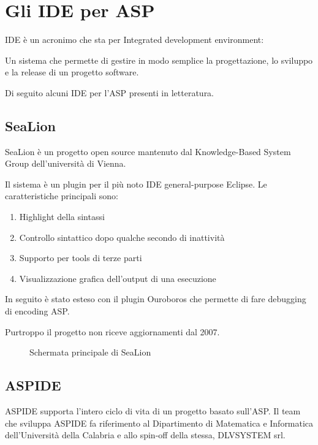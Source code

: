 \chapter[Gli IDE per ASP]{Gli IDE per ASP}

IDE è un acronimo che sta per Integrated development environment: 

Un sistema che permette di gestire in modo semplice la progettazione, lo sviluppo e la release di un progetto software.

Di seguito alcuni IDE per l'ASP presenti in letteratura.

\section{SeaLion}
SeaLion\cite{SEALION} è un progetto open source mantenuto dal Knowledge-Based System Group dell'università di Vienna.

Il sistema è un plugin per il più noto IDE general-purpose Eclipse.
Le caratteristiche principali sono:
\begin{enumerate}
	\item Highlight della sintassi
	\item Controllo sintattico dopo qualche secondo di inattività
	\item Supporto per tools di terze parti
	\item Visualizzazione grafica dell'output di una esecuzione
\end{enumerate}

In seguito è stato esteso con il plugin Ouroboros che permette di fare debugging di encoding ASP.

Purtroppo il progetto non riceve aggiornamenti dal 2007.

\begin{figure}[H]
	\centering
	\caption{Schermata principale di SeaLion}
\end{figure}

\section{ASPIDE}

ASPIDE\cite{ASPIDE} supporta l'intero ciclo di vita di un progetto basato sull'ASP.
Il team che sviluppa ASPIDE fa riferimento al Dipartimento di Matematica e Informatica dell'Università della Calabria e allo spin-off della stessa, DLVSYSTEM srl.

